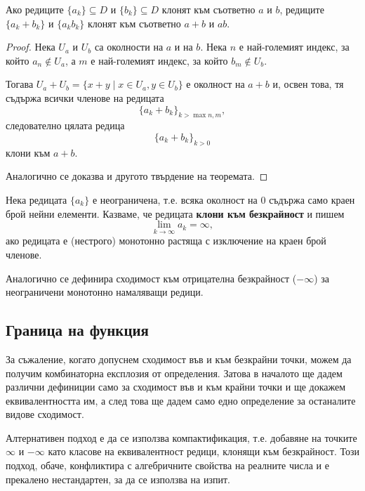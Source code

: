 \documentclass[numbers=endperiod, bibliography=totocnumbered]{scrartcl}
\begin{document}
\begin{proposition}\label{thm:limits_of_elementwise_sums_and_products}
  Ако редиците \( \{ a_k \} \subseteq D \) и \( \{ b_k \} \subseteq D \) клонят към съответно \( a \) и \( b \), редиците \( \{ a_k + b_k \} \) и \( \{ a_k b_k \} \) клонят към съответно \( a + b \) и \( ab \).
\end{proposition}
\begin{proof}
  Нека \( U_a \) и \( U_b \) са околности на \( a \) и на \( b \). Нека \( n \) е най-големият индекс, за който \( a_n \not\in U_a \), а \( m \) е най-големият индекс, за който \( b_m \not\in U_b \).

  Тогава \( U_a + U_b = \{ x + y \mid x \in U_a, y \in U_b \} \) е околност на \( a + b \) и, освен това, тя съдържа всички членове на редицата
  \begin{equation*}
    {\{ a_k + b_k \}}_{k > \max{n, m}},
  \end{equation*}
  следователно цялата редица
  \begin{equation*}
    {\{ a_k + b_k \}}_{k > 0}
  \end{equation*}
  клони към \( a + b \).

  Аналогично се доказва и другото твърдение на теоремата.
\end{proof}

\begin{definition}
  Нека редицата \( \{ a_k \} \) е неограничена, т.е. всяка околност на \( 0 \) съдържа само краен брой нейни елементи. Казваме, че редицата \textbf{клони към безкрайност} и пишем
  \begin{equation*}
    \lim_{k \to \infty} a_k = \infty,
  \end{equation*}
  ако редицата е (нестрого) монотонно растяща с изключение на краен брой членове.

  Аналогично се дефинира сходимост към отрицателна безкрайност (\( -\infty \)) за неограничени монотонно намаляващи редици.
\end{definition}

\subsection{Граница на функция}

\begin{remark}
  За съжаление, когато допуснем сходимост във и към безкрайни точки, можем да получим комбинаторна експлозия от определения. Затова в началото ще дадем различни дефиниции само за сходимост във и към крайни точки и ще докажем еквивалентността им, а след това ще дадем само едно определение за останалите видове сходимост.

  Алтернативен подход е да се използва компактификация, т.е. добавяне на точките \( \infty \) и \( -\infty \) като класове на еквивалентност редици, клонящи към безкрайност. Този подход, обаче, конфликтира с алгебричните свойства на реалните числа и е прекалено нестандартен, за да се използва на изпит.
\end{remark}
\end{document}
